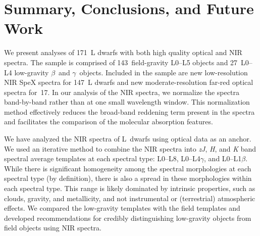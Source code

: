\documentclass[modern]{aastex61}
\newcommand{\sample}{171}
\newcommand{\optField}{143}
\newcommand{\optLowG}{27}
\newcommand{\NewOptObjects}{17} %
\newcommand{\NewPrismObjects}{147} %
\begin{document}
\section{Summary, Conclusions, and Future Work}
\label{sec:summary}
We present analyses of \sample~L dwarfs with both high quality optical and NIR spectra.
The sample is comprised of \optField~field-gravity L0--L5 objects and \optLowG~L0--L4 low-gravity $\beta$~and $\gamma$~objects.
Included in the sample are new low-resolution NIR SpeX spectra for \NewPrismObjects~L dwarfs and new moderate-resolution far-red optical spectra for~\NewOptObjects.
In our analysis of the NIR spectra, we normalize the spectra band-by-band rather than at one small wavelength window.
This normalization method effectively reduces the broad-band reddening term present in the spectra and facilitates the comparison of the molecular absorption features.

We have analyzed the NIR spectra of L~dwarfs using optical data as an anchor.
We used an iterative method to combine the NIR spectra into \emph{zJ}, \emph{H}, and \emph{K} band spectral average templates at each spectral type: L0--L8, L0--L4$\gamma$, and L0--L1$\beta$.
While there is significant homogeneity among the spectral morphologies at each spectral type (by definition), there is also a spread in these morphologies within each spectral type.
This range is likely dominated by intrinsic properties, such as clouds, gravity, and metallicity, and not instrumental or (terrestrial) atmospheric effects.
We compared the low-gravity templates with the field templates and developed recommendations for credibly distinguishing low-gravity objects from field objects using NIR spectra.
\end{document}
